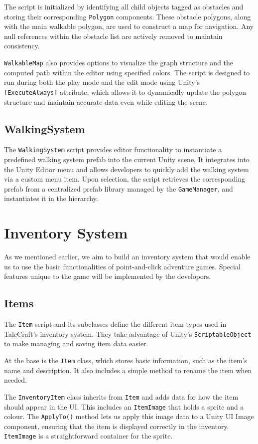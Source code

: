 The script is initialized by identifying all child objects tagged as obstacles and storing their corresponding \verb|Polygon| components. These obstacle polygons, along with the main walkable polygon, are used to construct a map for navigation. Any null references within the obstacle list are actively removed to maintain consistency.

\verb|WalkableMap| also provides options to visualize the graph structure and the computed path within the editor using specified colors. The script is designed to run during both the play mode and the edit mode using Unity’s \verb|[ExecuteAlways]| attribute, which allows it to dynamically update the polygon structure and maintain accurate data even while editing the scene.


\subsection{WalkingSystem}
The \verb|WalkingSystem| script provides editor functionality to instantiate a predefined walking system prefab into the current Unity scene. It integrates into the Unity Editor menu and allows developers to quickly add the walking system via a custom menu item. Upon selection, the script retrieves the corresponding prefab from a centralized prefab library managed by the \verb|GameManager|, and instantiates it in the hierarchy.

\section{Inventory System}
As we mentioned earlier, we aim to build an inventory system that would enable us to use the basic functionalities of point-and-click adventure games. Special features unique to the game will be implemented by the developers.

\subsection{Items}
The \verb|Item| script and its subclasses define the different item types used in TaleCraft’s inventory system. They take advantage of Unity’s \verb|ScriptableObject| to make managing and saving item data easier.

At the base is the \verb|Item| class, which stores basic information, such as the item’s name and description. It also includes a simple method to rename the item when needed.

The \verb|InventoryItem| class inherits from \verb|Item| and adds data for how the item should appear in the UI. This includes an \verb|ItemImage| that holds a sprite and a colour. The \verb|ApplyTo()| method lets us apply this image data to a Unity UI Image component, ensuring that the item is displayed correctly in the inventory. \verb|ItemImage| is a straightforward container for the sprite.


